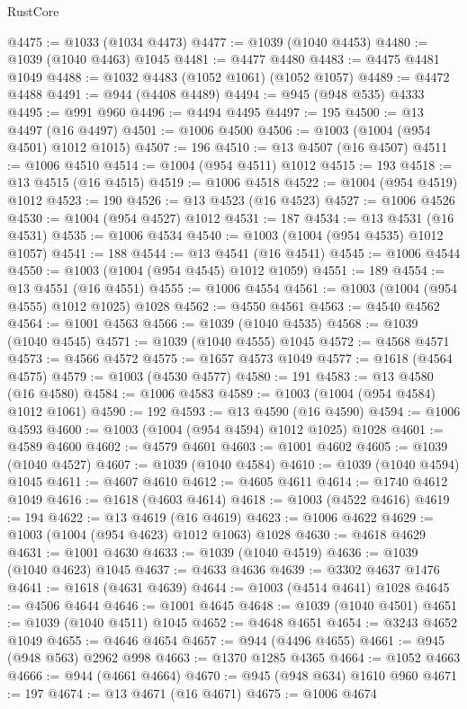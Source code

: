 \begin{lexlean}{RustCore}
\begin{coremodule}
@4475 := @1033 (@1034 @4473)
@4477 := @1039 (@1040 @4453)
@4480 := @1039 (@1040 @4463) @1045
@4481 := @4477 @4480
@4483 := @4475 @4481 @1049
@4488 := @1032 @4483 (@1052 @1061) (@1052 @1057)
@4489 := @4472 @4488
@4491 := @944 (@4408 @4489)
@4494 := @945 (@948 @535) @4333
@4495 := @991 @960
@4496 := @4494 @4495
@4497 := 195
@4500 := @13 @4497 (@16 @4497)
@4501 := @1006 @4500
@4506 := @1003 (@1004 (@954 @4501) @1012 @1015)
@4507 := 196
@4510 := @13 @4507 (@16 @4507)
@4511 := @1006 @4510
@4514 := @1004 (@954 @4511) @1012
@4515 := 193
@4518 := @13 @4515 (@16 @4515)
@4519 := @1006 @4518
@4522 := @1004 (@954 @4519) @1012
@4523 := 190
@4526 := @13 @4523 (@16 @4523)
@4527 := @1006 @4526
@4530 := @1004 (@954 @4527) @1012
@4531 := 187
@4534 := @13 @4531 (@16 @4531)
@4535 := @1006 @4534
@4540 := @1003 (@1004 (@954 @4535) @1012 @1057)
@4541 := 188
@4544 := @13 @4541 (@16 @4541)
@4545 := @1006 @4544
@4550 := @1003 (@1004 (@954 @4545) @1012 @1059)
@4551 := 189
@4554 := @13 @4551 (@16 @4551)
@4555 := @1006 @4554
@4561 := @1003 (@1004 (@954 @4555) @1012 @1025) @1028
@4562 := @4550 @4561
@4563 := @4540 @4562
@4564 := @1001 @4563
@4566 := @1039 (@1040 @4535)
@4568 := @1039 (@1040 @4545)
@4571 := @1039 (@1040 @4555) @1045
@4572 := @4568 @4571
@4573 := @4566 @4572
@4575 := @1657 @4573 @1049
@4577 := @1618 (@4564 @4575)
@4579 := @1003 (@4530 @4577)
@4580 := 191
@4583 := @13 @4580 (@16 @4580)
@4584 := @1006 @4583
@4589 := @1003 (@1004 (@954 @4584) @1012 @1061)
@4590 := 192
@4593 := @13 @4590 (@16 @4590)
@4594 := @1006 @4593
@4600 := @1003 (@1004 (@954 @4594) @1012 @1025) @1028
@4601 := @4589 @4600
@4602 := @4579 @4601
@4603 := @1001 @4602
@4605 := @1039 (@1040 @4527)
@4607 := @1039 (@1040 @4584)
@4610 := @1039 (@1040 @4594) @1045
@4611 := @4607 @4610
@4612 := @4605 @4611
@4614 := @1740 @4612 @1049
@4616 := @1618 (@4603 @4614)
@4618 := @1003 (@4522 @4616)
@4619 := 194
@4622 := @13 @4619 (@16 @4619)
@4623 := @1006 @4622
@4629 := @1003 (@1004 (@954 @4623) @1012 @1063) @1028
@4630 := @4618 @4629
@4631 := @1001 @4630
@4633 := @1039 (@1040 @4519)
@4636 := @1039 (@1040 @4623) @1045
@4637 := @4633 @4636
@4639 := @3302 @4637 @1476
@4641 := @1618 (@4631 @4639)
@4644 := @1003 (@4514 @4641) @1028
@4645 := @4506 @4644
@4646 := @1001 @4645
@4648 := @1039 (@1040 @4501)
@4651 := @1039 (@1040 @4511) @1045
@4652 := @4648 @4651
@4654 := @3243 @4652 @1049
@4655 := @4646 @4654
@4657 := @944 (@4496 @4655)
@4661 := @945 (@948 @563) @2962 @998
@4663 := @1370 @1285 @4365
@4664 := @1052 @4663
@4666 := @944 (@4661 @4664)
@4670 := @945 (@948 @634) @1610 @960
@4671 := 197
@4674 := @13 @4671 (@16 @4671)
@4675 := @1006 @4674

\end{coremodule}
\end{lexlean}
